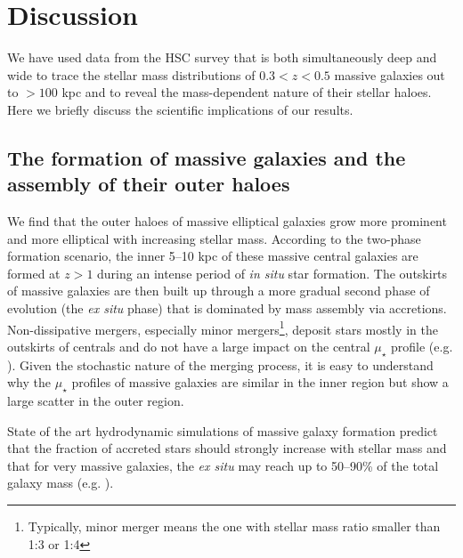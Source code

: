 \documentclass[fleqn,usenatbib]{mnras}
\def\mden{{$\mu_{\star}$}}
\begin{document}
\section{Discussion}
    \label{sec:discussion}
    
    We have used data from the HSC survey that is both simultaneously 
    deep and wide to trace the stellar mass distributions of $0.3 < z < 0.5$ massive 
    galaxies out to $>100$ kpc and to reveal the mass-dependent nature of their 
    stellar haloes.
    Here we briefly discuss the scientific implications of our results.

\subsection{The formation of massive galaxies and the assembly of their outer haloes}
    \label{ssec:twophase}
            
    We find that the outer haloes of massive elliptical galaxies grow more prominent 
    and more elliptical with increasing stellar mass.
    According to the two-phase formation scenario, the inner 5--10 kpc of these 
    massive central galaxies are formed at $z>1$ during an intense period of 
    \textit{in situ} star formation. 
    The outskirts of massive galaxies are then built up through a more gradual second 
    phase of evolution (the \textit{ex situ} phase) that is dominated by mass assembly 
    via accretions.
    Non-dissipative mergers, especially minor mergers\footnote{Typically, minor merger
    means the one with stellar mass ratio smaller than 1:3 or 1:4},  deposit stars
    mostly in the outskirts of centrals and do not have a large impact on the central
    \mden{} profile (e.g. \citealt{BoylanKolchin2008, Oogi2013, Bedorf2013}).
    Given the stochastic nature of the merging process, it is easy to understand why 
    the \mden{} profiles of massive galaxies are similar in the inner region but show
    a large scatter in the outer region. 
        
    State of the art hydrodynamic simulations of massive galaxy formation predict 
    that the fraction of accreted stars should strongly increase with stellar 
    mass and that for very massive galaxies, the \textit{ex situ} may reach up to 
    50--90\% of the total galaxy mass (e.g.
    \citealt{Oser2010, Cooper2013, Dubois2013, LeeYi2013, Hirschmann2015,
    RodriguezGomez2016}). 
    
\end{document}
